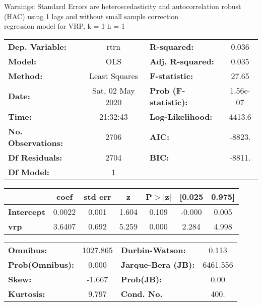 Warnings: \newline
 [1] Standard Errors are heteroscedasticity and autocorrelation robust (HAC) using 1 lags and without small sample correction\\ 

regression model for VRP, k = 1 h = 1\begin{center}
\begin{tabular}{lclc}
\toprule
\textbf{Dep. Variable:}    &       rtrn       & \textbf{  R-squared:         } &     0.036   \\
\textbf{Model:}            &       OLS        & \textbf{  Adj. R-squared:    } &     0.035   \\
\textbf{Method:}           &  Least Squares   & \textbf{  F-statistic:       } &     27.65   \\
\textbf{Date:}             & Sat, 02 May 2020 & \textbf{  Prob (F-statistic):} &  1.56e-07   \\
\textbf{Time:}             &     21:32:43     & \textbf{  Log-Likelihood:    } &    4413.6   \\
\textbf{No. Observations:} &        2706      & \textbf{  AIC:               } &    -8823.   \\
\textbf{Df Residuals:}     &        2704      & \textbf{  BIC:               } &    -8811.   \\
\textbf{Df Model:}         &           1      & \textbf{                     } &             \\
\bottomrule
\end{tabular}
\begin{tabular}{lcccccc}
                   & \textbf{coef} & \textbf{std err} & \textbf{z} & \textbf{P$> |$z$|$} & \textbf{[0.025} & \textbf{0.975]}  \\
\midrule
\textbf{Intercept} &       0.0022  &        0.001     &     1.604  &         0.109        &       -0.000    &        0.005     \\
\textbf{vrp}       &       3.6407  &        0.692     &     5.259  &         0.000        &        2.284    &        4.998     \\
\bottomrule
\end{tabular}
\begin{tabular}{lclc}
\textbf{Omnibus:}       & 1027.865 & \textbf{  Durbin-Watson:     } &    0.113  \\
\textbf{Prob(Omnibus):} &   0.000  & \textbf{  Jarque-Bera (JB):  } & 6461.556  \\
\textbf{Skew:}          &  -1.667  & \textbf{  Prob(JB):          } &     0.00  \\
\textbf{Kurtosis:}      &   9.797  & \textbf{  Cond. No.          } &     400.  \\
\bottomrule
\end{tabular}
\end{center}

